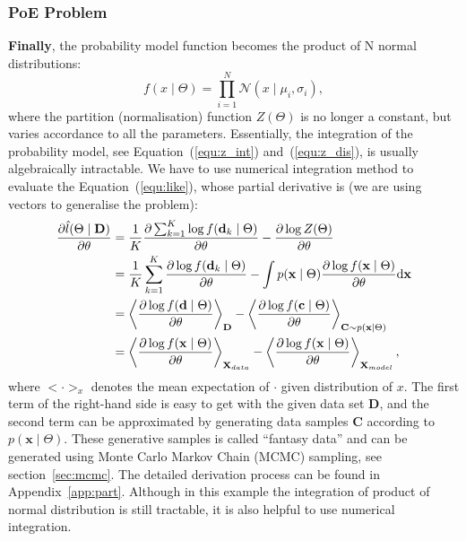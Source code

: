 \subsubsection{PoE Problem}
	\textbf{Finally}, the probability model function becomes the product of N normal distributions: 
	\begin{equation}
	f(x \mid \Theta ) = \prod_{i=1}^N\mathcal{N}(x \mid \mu_i, \sigma_i ),
	\end{equation}
	where the partition (normalisation) function $Z( \Theta)$ is no longer a constant, but varies accordance to all the parameters.
	Essentially, the integration of the probability model, see Equation~(\ref{equ:z_int}) and~(\ref{equ:z_dis}), is usually algebraically intractable.
	We have to use numerical integration method to evaluate the Equation~(\ref{equ:like}), whose partial derivative is (we are using vectors to generalise the problem):
	\begin{equation}
	\label{equ:part}
	\begin{aligned}
	\dfrac{\partial \hat{l} (\Theta \mid \mathbf{D})}{\partial \theta} 
	& = \frac{1}{K} \dfrac{\partial \sum_{k=1}^K\log f(\mathbf{d}_k \mid \Theta )}{\partial \theta} - \dfrac{\partial \log Z( \Theta)}{\partial \theta}\\
	& =  \frac{1}{K}\sum_{k=1}^K \dfrac{\partial \log f(\mathbf{d}_k \mid \Theta)}{\partial \theta} - \int p(\mathbf{x} \mid \Theta) \dfrac{\partial \log f(\mathbf{x} \mid \Theta)}{\partial \theta} \mathrm{d} \mathbf{x}\\
	& = \left \langle \dfrac{\partial \log f(\mathbf{d} \mid \Theta)}{\partial \theta}\right \rangle_{\mathbf{D}} -\left \langle \dfrac{\partial \log f(\mathbf{c} \mid \Theta)}{\partial \theta}\right \rangle_{\mathbf{C} \sim p(\mathbf{x} \mid \Theta)}  \\
	&=\left \langle \dfrac{\partial \log f(\mathbf{x} \mid \Theta)}{\partial \theta}\right \rangle_{\mathbf{X}_{data}} - \left \langle \dfrac{\partial \log f(\mathbf{x} \mid \Theta)}{\partial \theta}\right \rangle_{\mathbf{X}_{model}},
	\end{aligned}
	\end{equation}
	where  $ <\cdot>_x $ denotes the mean expectation of $ \cdot $ given distribution of $x$.
	The first term of the right-hand side is easy to get with the given data set $ \mathbf{D} $, and the second term can be approximated by generating data samples $ \mathbf{C} $ according to $ p(\mathbf{x} \mid \Theta) $.
	These generative samples is called ``fantasy data'' and can be generated using Monte Carlo Markov Chain (MCMC) sampling, see section~\ref{sec:mcmc}.
	The detailed derivation process can be found in Appendix~\ref{app:part}.
	Although in this example the integration of product of normal distribution is still tractable, it is also helpful to use numerical integration.

